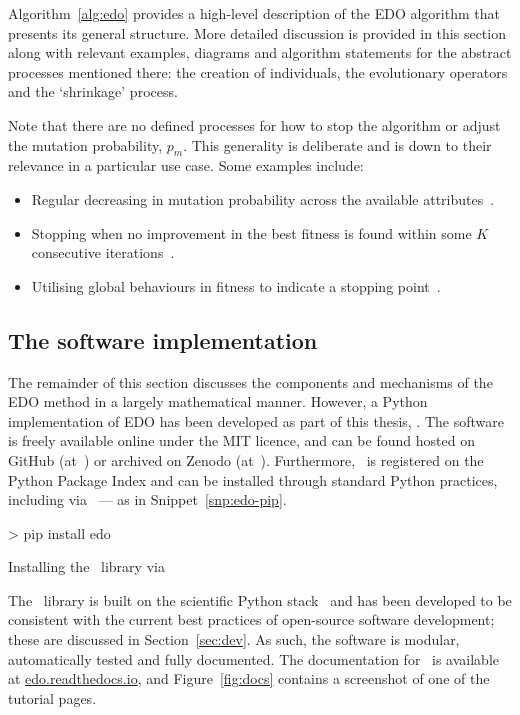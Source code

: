Algorithm~\ref{alg:edo} provides a high-level description of the EDO algorithm
that presents its general structure. More detailed discussion is provided in
this section along with relevant examples, diagrams and algorithm statements for
the abstract processes mentioned there: the creation of individuals, the
evolutionary operators and the `shrinkage' process.


Note that there are no defined processes for how to stop the
algorithm or adjust the mutation probability, \(p_m\). This generality is
deliberate and is down to their relevance in a particular use case. Some
examples include:
\begin{itemize}
    \item Regular decreasing in mutation probability across the available
        attributes~\cite{Kuehn2013}.
    \item Stopping when no improvement in the best fitness is found within some
        \(K\) consecutive iterations~\cite{Leung2001}.
    \item Utilising global behaviours in fitness to indicate a stopping
        point~\cite{Marti2016}.
\end{itemize}


\subsection{The software implementation}

The remainder of this section discusses the components and mechanisms of the EDO
method in a largely mathematical manner. However, a Python implementation of EDO
has been developed as part of this thesis, \edo. The software is freely
available online under the MIT licence, and can be found hosted on GitHub
(at~) or archived on Zenodo
(at~). Furthermore, \edo\ is registered on the
Python Package Index and can be installed through standard Python practices,
including via \pip\ --- as in Snippet~\ref{snp:edo-pip}.

\begin{listing}[htbp]
\begin{usagesh}
> pip install edo
\end{usagesh}
\caption{Installing the \edo\ library via \pip}\label{snp:edo-pip}
\end{listing}

The \edo\ library is built on the scientific Python stack~\cite{pandas,numpy}
and has been developed to be consistent with the current best practices of
open-source software development; these are discussed in
Section~\ref{sec:dev}. As such, the software is modular, automatically tested
and fully documented. The documentation for \edo\ is available at
\url{edo.readthedocs.io}, and Figure~\ref{fig:docs} contains a screenshot of one
of the tutorial pages.

